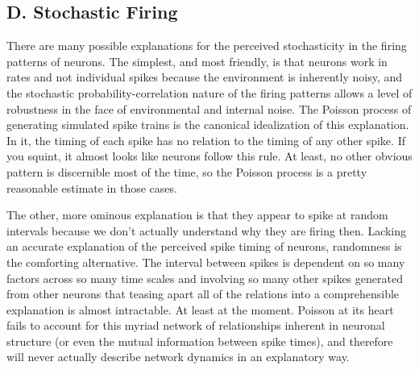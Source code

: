 \documentclass[12pt]{article}
\begin{document}
\subsection{D. Stochastic Firing}

There are many possible explanations for the perceived stochasticity in the firing patterns of neurons.  The simplest, and most friendly, is that neurons work in rates and not individual spikes because the environment is inherently noisy, and the stochastic probability-correlation nature of the firing patterns allows a level of robustness in the face of environmental and internal noise.  The Poisson process of generating simulated spike trains is the canonical idealization of this explanation.  In it, the timing of each spike has no relation to the timing of any other spike.  If you squint, it almost looks like neurons follow this rule.  At least, no other obvious pattern is discernible most of the time, so the Poisson process is a pretty reasonable estimate in those cases.  

The other, more ominous explanation is that they appear to spike at random intervals because we don't actually understand why they are firing then.  Lacking an accurate explanation of the perceived spike timing of neurons, randomness is the comforting alternative.  The interval between spikes is dependent on so many factors across so many time scales and involving so many other spikes generated from other neurons that teasing apart all of the relations into a comprehensible explanation is almost intractable.  At least at the moment.  Poisson at its heart fails to account for this myriad network of relationships inherent in neuronal structure (or even the mutual information between spike times), and therefore will never actually describe network dynamics in an explanatory way.  
\end{document}
